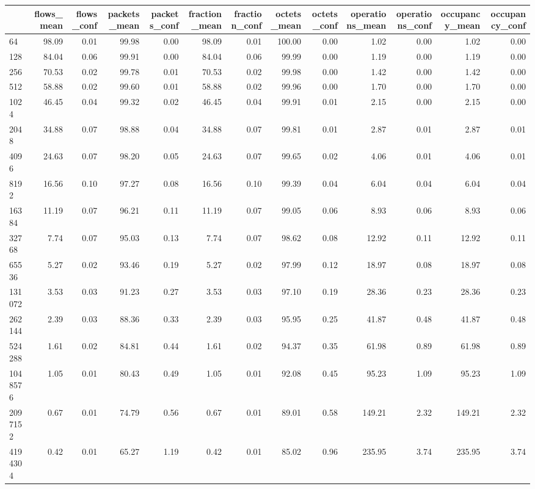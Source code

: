 \begin{tabular}{lrrrrrrrrrrrr}
\toprule
 & flows_mean & flows_conf & packets_mean & packets_conf & fraction_mean & fraction_conf & octets_mean & octets_conf & operations_mean & operations_conf & occupancy_mean & occupancy_conf \\
\midrule
64 & 98.09 & 0.01 & 99.98 & 0.00 & 98.09 & 0.01 & 100.00 & 0.00 & 1.02 & 0.00 & 1.02 & 0.00 \\
128 & 84.04 & 0.06 & 99.91 & 0.00 & 84.04 & 0.06 & 99.99 & 0.00 & 1.19 & 0.00 & 1.19 & 0.00 \\
256 & 70.53 & 0.02 & 99.78 & 0.01 & 70.53 & 0.02 & 99.98 & 0.00 & 1.42 & 0.00 & 1.42 & 0.00 \\
512 & 58.88 & 0.02 & 99.60 & 0.01 & 58.88 & 0.02 & 99.96 & 0.00 & 1.70 & 0.00 & 1.70 & 0.00 \\
1024 & 46.45 & 0.04 & 99.32 & 0.02 & 46.45 & 0.04 & 99.91 & 0.01 & 2.15 & 0.00 & 2.15 & 0.00 \\
2048 & 34.88 & 0.07 & 98.88 & 0.04 & 34.88 & 0.07 & 99.81 & 0.01 & 2.87 & 0.01 & 2.87 & 0.01 \\
4096 & 24.63 & 0.07 & 98.20 & 0.05 & 24.63 & 0.07 & 99.65 & 0.02 & 4.06 & 0.01 & 4.06 & 0.01 \\
8192 & 16.56 & 0.10 & 97.27 & 0.08 & 16.56 & 0.10 & 99.39 & 0.04 & 6.04 & 0.04 & 6.04 & 0.04 \\
16384 & 11.19 & 0.07 & 96.21 & 0.11 & 11.19 & 0.07 & 99.05 & 0.06 & 8.93 & 0.06 & 8.93 & 0.06 \\
32768 & 7.74 & 0.07 & 95.03 & 0.13 & 7.74 & 0.07 & 98.62 & 0.08 & 12.92 & 0.11 & 12.92 & 0.11 \\
65536 & 5.27 & 0.02 & 93.46 & 0.19 & 5.27 & 0.02 & 97.99 & 0.12 & 18.97 & 0.08 & 18.97 & 0.08 \\
131072 & 3.53 & 0.03 & 91.23 & 0.27 & 3.53 & 0.03 & 97.10 & 0.19 & 28.36 & 0.23 & 28.36 & 0.23 \\
262144 & 2.39 & 0.03 & 88.36 & 0.33 & 2.39 & 0.03 & 95.95 & 0.25 & 41.87 & 0.48 & 41.87 & 0.48 \\
524288 & 1.61 & 0.02 & 84.81 & 0.44 & 1.61 & 0.02 & 94.37 & 0.35 & 61.98 & 0.89 & 61.98 & 0.89 \\
1048576 & 1.05 & 0.01 & 80.43 & 0.49 & 1.05 & 0.01 & 92.08 & 0.45 & 95.23 & 1.09 & 95.23 & 1.09 \\
2097152 & 0.67 & 0.01 & 74.79 & 0.56 & 0.67 & 0.01 & 89.01 & 0.58 & 149.21 & 2.32 & 149.21 & 2.32 \\
4194304 & 0.42 & 0.01 & 65.27 & 1.19 & 0.42 & 0.01 & 85.02 & 0.96 & 235.95 & 3.74 & 235.95 & 3.74 \\

\end{tabular}
